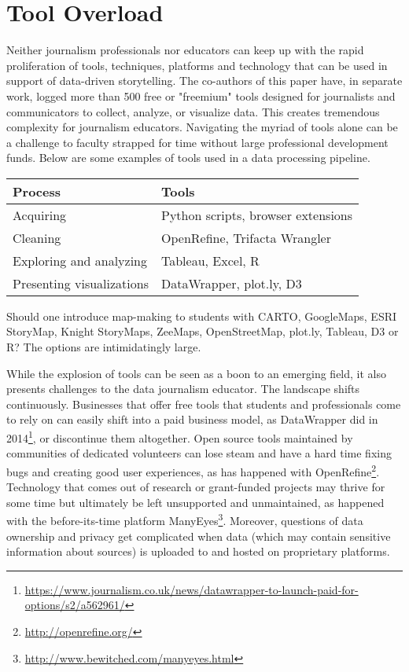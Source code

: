 \documentclass{acm_proc_article-sp}
\begin{document}
\section{Tool Overload}

Neither journalism professionals nor educators can keep up with the rapid proliferation of tools, techniques, platforms and technology that can be used in support of data-driven storytelling. The co-authors of this paper have, in separate work, logged more than 500 free or "freemium" tools designed for journalists and communicators to collect, analyze, or visualize data. This creates tremendous complexity for journalism educators. Navigating the myriad of tools alone can be a challenge to faculty strapped for time without large professional development funds. Below are some examples of tools used in a data processing pipeline.  

\begin{tabular}{ |p{2.3cm}|p{5.3cm}| } 
 \hline
 Process & Tools \\
 \hline
 \hline
 Acquiring & Python scripts, browser extensions \\ \hline
 Cleaning & OpenRefine, Trifacta Wrangler \\ \hline
 Exploring and analyzing & Tableau, Excel, R \\ \hline
 Presenting visualizations & DataWrapper, plot.ly, D3 \\
 \hline
\end{tabular}

Should one introduce map-making to students with CARTO, GoogleMaps, ESRI StoryMap, Knight StoryMaps, ZeeMaps, OpenStreetMap, plot.ly, Tableau, D3 or R?  The options are intimidatingly large.

While the explosion of tools can be seen as a boon to an emerging field, it also presents challenges to the data journalism educator. The landscape shifts continuously. Businesses that offer free tools that students and professionals come to rely on can easily shift into a paid business model, as DataWrapper did in 2014\footnote{\url{https://www.journalism.co.uk/news/datawrapper-to-launch-paid-for-options/s2/a562961/}}, or discontinue them altogether. Open source tools maintained by communities of dedicated volunteers can lose steam and have a hard time fixing bugs and creating good user experiences, as has happened with OpenRefine\footnote{\url{http://openrefine.org/}}. Technology that comes out of research or grant-funded projects may thrive for some time but ultimately be left unsupported and unmaintained, as happened with the before-its-time platform ManyEyes\footnote{\url{http://www.bewitched.com/manyeyes.html}}. Moreover, questions of data ownership and privacy get complicated when data (which may contain sensitive information about sources) is uploaded to and hosted on proprietary platforms. 
\end{document}
